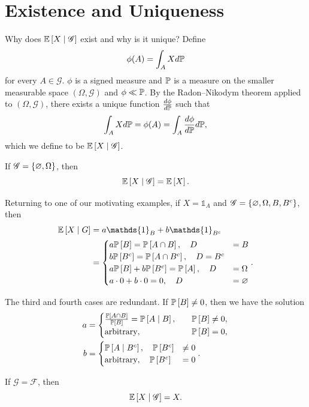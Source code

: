 \section{Existence and Uniqueness}

Why does $\E\left[X \mid \mathscr{G}\right] $ exist and why is it unique? Define \[
	\phi(A) = \int_A X d\P
\] for every $A \in \mathscr{G}$. $\phi$ is a signed measure and $\P$ is a measure on the smaller measurable space $\left( \Omega, \mathscr{G} \right)$ and $\phi \ll \P$. By the Radon--Nikodym theorem applied to $\left( \Omega, \mathscr{G} \right)$, there exists a unique function $\frac{d\phi}{d\P}$ such that \[
	\int_A Xd\P = \phi(A) = \int_A \frac{d\phi}{d\P}d\P
,\] which we define to be $\E\left[X \mid \mathscr{G}\right] $.

\begin{example}
	If $\mathscr{G} = \left\{\O, \Omega\right\}$, then \[
		\E\left[X \mid \mathscr{G}\right]  = \E\left[X\right] 
	.\] 

	Returning to one of our motivating examples, if $X = \mathds{1}_{A}$ and $\mathscr{G} = \left\{\O, \Omega, B, B^{c}\right\}$, then
	\begin{align*}
		\E\left[X \mid G\right] &= a \mathds{1}_{B} + b \mathds{1}_{B^{c}}\\
		&= \begin{cases}
			a \P\left[B \right] = \P\left[A \cap B\right], \quad D &= B \\
			b \P\left[B^{c}\right] = \P\left[A \cap B^{c}\right],\quad D = B^{c} \\
			a\P\left[B \right] + b \P\left[B^{c}\right] = \P\left[A\right] , \quad D &= \Omega \\
			a \cdot 0 + b \cdot 0 = 0, \quad D &= \O
		\end{cases}
	.\end{align*} 

	The third and fourth cases are redundant. If $\P\left[B\right] \ne 0$, then we have the solution
	\begin{align*}
		a &= \begin{cases}
			\frac{\P\left[A \cap B\right] }{\P\left[B\right] } = \P\left[A \mid B\right] , \quad &\P\left[B \right] \ne 0, \\
			\text{arbitrary}, \quad &\P\left[B\right] = 0,
		\end{cases} \\
		b &= \begin{cases}
			\P\left[A \mid B^{c}\right] , \quad \P\left[B^{c}\right]  &\ne 0 \\
			\text{arbitrary}, \quad \P\left[B^{c}\right]  &= 0
		\end{cases}
	.\end{align*}

	If $\mathscr{G} = \mathscr{F}$, then \[
		\E\left[X \mid \mathscr{G}\right]  = X
	.\] 
\end{example}

